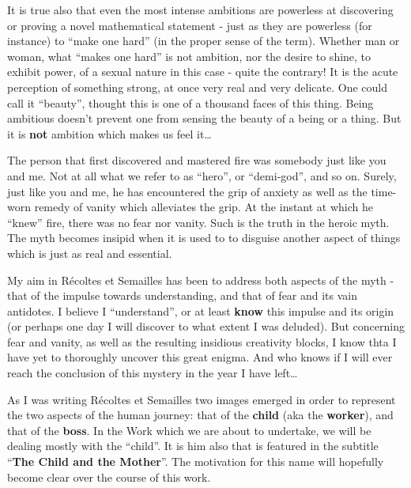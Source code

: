 It is true also that even the most intense ambitions are
powerless at discovering or proving a novel mathematical statement - just as they are
powerless (for instance) to ``make one hard'' (in the proper sense of the term).
Whether man or woman, what ``makes one hard'' is not ambition, nor the desire to shine, to
exhibit power, of a sexual nature in this case - quite the contrary!
It is the acute perception of something strong, at once very real and very delicate. 
One could call it ``beauty'', thought this is one of
a thousand faces of this thing. Being ambitious doesn't prevent one from 
sensing the beauty of a being or a thing. But it is \textbf{not} ambition which makes us
feel it\ldots 

The person that first discovered and mastered fire was somebody just like you and me. 
Not at all what we refer to as ``hero'', or ``demi-god'', and so on.  
Surely, just like you and me, he has encountered the grip of anxiety as well as the 
time-worn remedy of vanity which alleviates the grip.
At the instant at which he ``knew'' fire, there was no fear nor vanity. 
Such is the truth in the heroic myth. 
The myth becomes insipid when it is used to
to disguise another aspect of things which is just as real and essential. 

My aim in R\'ecoltes et Semailles has been to address both aspects of the myth - that of
the impulse towards understanding, and that of fear and its vain antidotes. 
I believe I ``understand'', or at least \textbf{know} this impulse and its origin (or
perhaps one day I will discover to what extent I was deluded). 
But concerning fear and vanity, as well as the resulting insidious creativity blocks, 
I know thta I have yet to thoroughly uncover this great enigma. 
And who knows if I will ever reach the conclusion of this mystery in the year I have
left\ldots

As I was writing 
R\'ecoltes et Semailles 
two images emerged in order to represent the two aspects of the human journey:
that of the \textbf{child} (aka the \textbf{worker}), and that of the
\textbf{boss}.
In the Work which we are about to undertake, we will be dealing mostly with the ``child''.
It is him also that is featured in the subtitle ``\textbf{The Child and the Mother}''. 
The motivation for this name 
will hopefully become clear over the course of this work.

